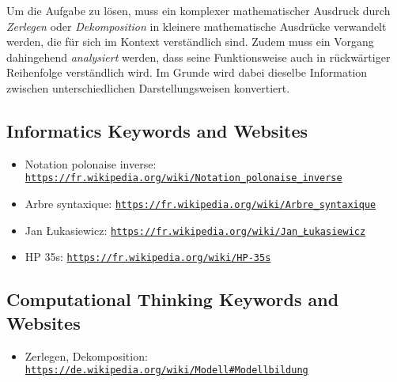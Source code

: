 \documentclass[a4paper,11pt]{report}
\newcommand{\BrochureUrlText}[1]{\texttt{#1}}
\begin{document}
Um die Aufgabe zu lösen, muss ein komplexer mathematischer Ausdruck durch \emph{Zerlegen} oder \emph{Dekomposition} in kleinere mathematische Ausdrücke verwandelt werden, die für sich im Kontext verständlich sind. Zudem muss ein Vorgang dahingehend \emph{analysiert} werden, dass seine Funktionsweise auch in rückwärtiger Reihenfolge verständlich wird. Im Grunde wird dabei dieselbe Information zwischen unterschiedlichen Darstellungsweisen konvertiert.


\subsection*{Informatics Keywords and Websites}

\begin{itemize}
  \item Notation polonaise inverse: \href{https://fr.wikipedia.org/wiki/Notation_polonaise_inverse}{\BrochureUrlText{https://fr.wikipedia.org/wiki/Notation\_polonaise\_inverse}}
  \item Arbre syntaxique: \href{https://fr.wikipedia.org/wiki/Arbre_syntaxique}{\BrochureUrlText{https://fr.wikipedia.org/wiki/Arbre\_syntaxique}}
  \item Jan Łukasiewicz: \href{https://fr.wikipedia.org/wiki/Jan_\%C5\%81ukasiewicz}{\BrochureUrlText{https://fr.wikipedia.org/wiki/Jan\_Łukasiewicz}}
  \item HP 35s: \href{https://fr.wikipedia.org/wiki/HP-35s}{\BrochureUrlText{https://fr.wikipedia.org/wiki/HP-35s}}
\end{itemize}


\subsection*{Computational Thinking Keywords and Websites}

\begin{itemize}
  \item Zerlegen, Dekomposition: \href{https://de.wikipedia.org/wiki/Modell\#Modellbildung}{\BrochureUrlText{https://de.wikipedia.org/wiki/Modell\#Modellbildung}}
\end{itemize}
\end{document}
